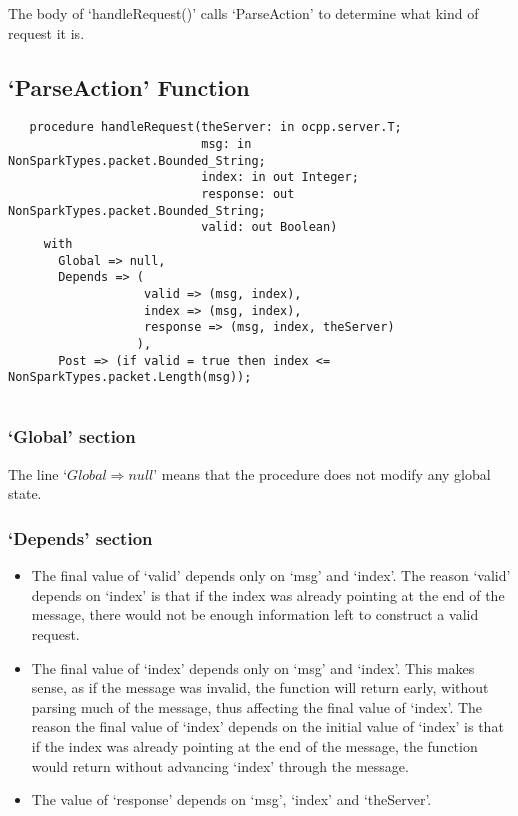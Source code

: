 \documentclass[12pt,openany,a4paper]{book}
\begin{document}
The body of `handleRequest()' calls `ParseAction' to determine what kind of request it is.

















\subsection{`ParseAction' Function}
\begin{verbatim}
   procedure handleRequest(theServer: in ocpp.server.T;
                           msg: in NonSparkTypes.packet.Bounded_String;
                           index: in out Integer;
                           response: out NonSparkTypes.packet.Bounded_String;
                           valid: out Boolean)
     with
       Global => null,
       Depends => (
                   valid => (msg, index),
                   index => (msg, index),
                   response => (msg, index, theServer)
                  ),
       Post => (if valid = true then index <= NonSparkTypes.packet.Length(msg));
   
\end{verbatim}
\subsubsection{`Global' section}
The line `$Global \Rightarrow null$' means that the procedure does not modify any global state.
\subsubsection{`Depends' section}
\begin{itemize}
\item The final value of `valid' depends only on `msg' and `index'. The reason `valid' depends on `index' is that if the index was already pointing at the end of the message, there would not be enough information left to construct a valid request.
\item The final value of `index' depends only on `msg' and `index'. This makes sense, as if the message was invalid, the function will return early, without parsing much of the message, thus affecting the final value of `index'. The reason the final value of `index' depends on the initial value of `index' is that if the index was already pointing at the end of the message, the function would return without advancing `index' through the message.
\item The value of `response' depends on `msg', `index' and `theServer'. 
\end{itemize}
\end{document}
